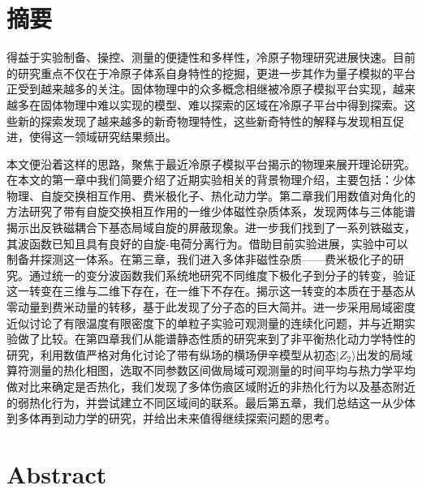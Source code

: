 \maketitle%
\MAKETITLE%
\makedeclaration%
\intobmk\chapter*{摘\quad 要}%
\setcounter{page}{1}%

得益于实验制备、操控、测量的便捷性和多样性，冷原子物理研究进展快速。目前的研究重点不仅在于冷原子体系自身特性的挖掘，更进一步其作为量子模拟的平台正受到越来越多的关注。固体物理中的众多概念相继被冷原子模拟平台实现，越来越多在固体物理中难以实现的模型、难以探索的区域在冷原子平台中得到探索。这些新的探索发现了越来越多的新奇物理特性，这些新奇特性的解释与发现相互促进，使得这一领域研究结果频出。

本文便沿着这样的思路，聚焦于最近冷原子模拟平台揭示的物理来展开理论研究。在本文的第一章中我们简要介绍了近期实验相关的背景物理介绍，主要包括：少体物理、自旋交换相互作用、费米极化子、热化动力学。第二章我们用数值对角化的方法研究了带有自旋交换相互作用的一维少体磁性杂质体系，发现两体与三体能谱揭示出反铁磁耦合下基态局域自旋的屏蔽现象。进一步我们找到了一系列铁磁支，其波函数已知且具有良好的自旋-电荷分离行为。借助目前实验进展，实验中可以制备并探测这一体系。在第三章，我们进入多体非磁性杂质——费米极化子的研究。通过统一的变分波函数我们系统地研究不同维度下极化子到分子的转变，验证这一转变在三维与二维下存在，在一维下不存在。揭示这一转变的本质在于基态从零动量到费米动量的转移，基于此发现了分子态的巨大简并。进一步采用局域密度近似讨论了有限温度有限密度下的单粒子实验可观测量的连续化问题，并与近期实验做了比较。在第四章我们从能谱静态性质的研究来到了非平衡热化动力学特性的研究，利用数值严格对角化讨论了带有纵场的横场伊辛模型从初态$|Z_2\rangle$出发的局域算符测量的热化相图，选取不同参数区间做局域可观测量的时间平均与热力学平均做对比来确定是否热化，我们发现了多体伤痕区域附近的非热化行为以及基态附近的弱热化行为，并尝试建立不同区域间的联系。最后第五章，我们总结这一从少体到多体再到动力学的研究，并给出未来值得继续探索问题的思考。



\intobmk\chapter*{Abstract}%

